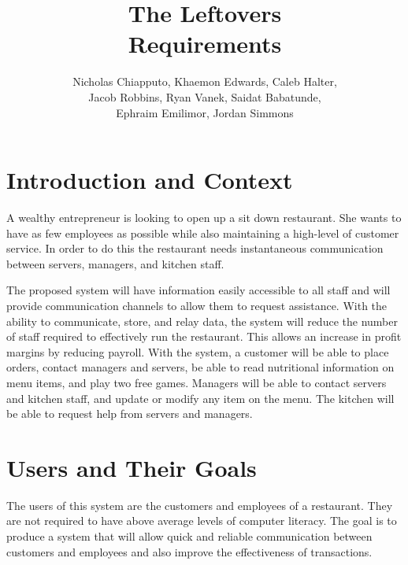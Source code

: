 \documentclass[12pt]{article}
\begin{document}
	\title{ The Leftovers \\
			\Large{Requirements} }

	\author{	Nicholas Chiapputo, Khaemon Edwards, Caleb Halter, \\
				Jacob Robbins, Ryan Vanek, Saidat Babatunde, \\
				Ephraim Emilimor, Jordan Simmons
	}

	\maketitle

	\section{Introduction and Context}
		A wealthy entrepreneur is looking to open up a sit down restaurant. She wants to have as few employees as possible while also maintaining a high-level of customer service. In order to do this the restaurant needs instantaneous communication between servers, managers, and kitchen staff.
        
		The proposed system will have information easily accessible to all staff and will provide communication channels to allow them to request assistance. With the ability to communicate, store, and relay data, the system will reduce the number of staff required to effectively run the restaurant. This allows an increase in profit margins by reducing payroll. With the system, a customer will be able to place orders, contact managers and servers, be able to read nutritional information on menu items, and play two free games. Managers will be able to contact servers and kitchen staff, and update or modify any item on the menu. The kitchen will be able to request help from servers and managers.

	\section{Users and Their Goals}
		The users of this system are the customers and employees of a restaurant. They are not required to have above average levels of computer literacy. The goal is to produce a system that will allow quick and reliable communication between customers and employees and also improve the effectiveness of transactions. 
\end{document}
